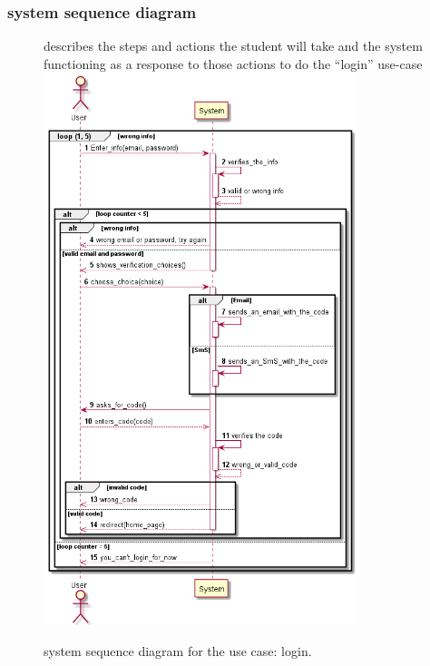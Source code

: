 \documentclass[]{uc2pfecaneva}
\begin{document}
    \subsubsection{system sequence diagram}
    \begin{figure}[h]
        describes the steps and actions the student will take and the system functioning as a response
        to those actions to do the “login” use-case
        \centering
        \includegraphics[width=260pt]{images/Login_dss}

        \caption{system sequence diagram for the use case: login.}
    \end{figure}
    \clearpage
\end{document}
